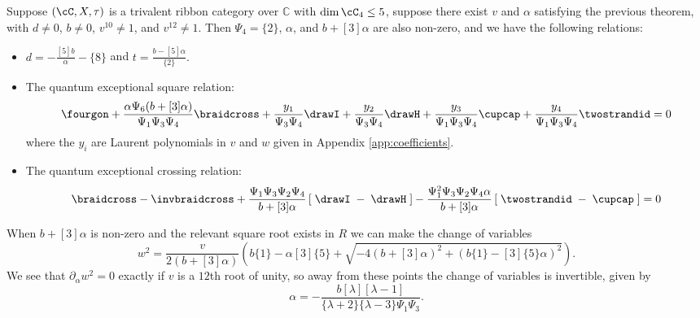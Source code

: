 \documentclass[12pt]{amsart}
\begin{document}
\begin{theorem}\label{thm:square-crossing}
Suppose $(\cC, X, \tau)$ is a trivalent ribbon category over $\mathbb{C}$ with
$\dim{\cC_4} \leq 5$, suppose there exist $v$ and $\alpha$ satisfying the
previous theorem, with $d \neq 0 $, $b \neq 0$, $v^{10} \neq 1$, and $v^{12}
\neq 1$.  Then $\Psi_4 = \{2\}$, $\alpha$, and $b+[3]\alpha$ are
also non-zero, and we have the following relations:
\begin{itemize}
\item
$
  d = -\frac{[5] b}{\alpha} - \{8\} 
$
and
$
  t = \frac{b-[5] \alpha}{\{2\}}.
$
\item

The quantum exceptional square relation:
\begin{equation*} \fourgon + \frac{\alpha \Psi_6 (b+[3]\alpha)}{\Psi_1 \Psi_3 \Psi_4}  \braidcross + \frac{y_1}{\Psi_3 \Psi_4}  \drawI + \frac{y_2}{\Psi_3 \Psi_4}  \drawH + \frac{y_3}{\Psi_1 \Psi_3 \Psi_4} \cupcap + \frac{y_4}{\Psi_1 \Psi_3 \Psi_4} \twostrandid =0
\end{equation*}
where the $y_i$ are Laurent polynomials in $v$ and $w$ given in Appendix \ref{app:coefficients}.
\item
The quantum exceptional crossing relation:
\begin{equation*}
\braidcross - \invbraidcross + \frac{\Psi_1 \Psi_3 \Psi_2 \Psi_4}{b+[3]\alpha} \left[\; \drawI \; - \; \drawH \; \right] - \frac{\Psi_1^2 \Psi_3 \Psi_2 \Psi_4 \alpha}{b+[3]\alpha} \left[\; \twostrandid \; - \; \cupcap \; \right] = 0
\end{equation*}
\end{itemize}

\end{theorem}


When $b+[3]\alpha$ is non-zero and the relevant square root exists in $R$ we can make the change of variables
\begin{equation}\label{eq:change-variables}
  w^2 = \frac{v}{2(b+[3]\alpha)}\left(b \{1\} -\alpha [3] \{5\} + \sqrt{-4 (b+[3]\alpha)^2 + (b \{1\} -[3]\{5\}\alpha)^2} \right).
\end{equation}
We see that $\partial_\alpha w^2 = 0$ exactly if $v$ is a $12$th root of
unity, so away from these points the change of variables is invertible, given
by
$$\alpha =  -\frac{b[\lambda][\lambda-1]}{\{\lambda+2\}\{\lambda-3\}\Psi_1\Psi_3}.$$
\end{document}

